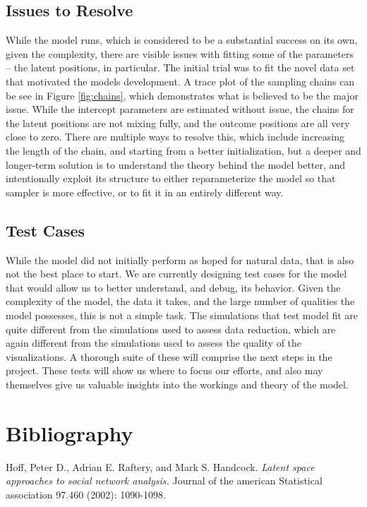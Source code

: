\documentclass[11pt]{scrartcl}
\begin{document}
\subsection{Issues to Resolve}
While the model runs, which is considered to be a substantial success on its own, given the complexity, there are visible issues with fitting some of the parameters -- the latent positions, in particular. The initial trial was to fit the novel data set that motivated the models development. A trace plot of the sampling chains can be see in Figure \ref{fig:chains}, which demonstrates what is believed to be the major issue. While the intercept parameters are estimated without issue, the chains for the latent positions are not mixing fully, and the outcome positions are all very close to zero. There are multiple ways to resolve this, which include increasing the length of the chain, and starting from a better initialization, but a deeper and longer-term solution is to understand the theory behind the model better, and intentionally exploit its structure to either reparameterize the model so that sampler is more effective, or to fit it in an entirely different way. 

\subsection{Test Cases}
While the model did not initially perform as hoped for natural data, that is also not the best place to start. We are currently designing test cases for the model that would allow us to better understand, and debug, its behavior. Given the complexity of the model, the data it takes, and the large number of qualities the model possesses, this is not a simple task. The simulations that test model fit are quite different from the simulations used to assess data reduction, which are again different from the simulations used to assess the quality of the visualizations. A thorough suite of these will comprise the next steps in the project. These tests will show us where to focus our efforts, and also may themselves give us valuable insights into the workings and theory of the model.





\section{Bibliography}

Hoff, Peter D., Adrian E. Raftery, and Mark S. Handcock. \textit{Latent space approaches to social network analysis.} Journal of the american Statistical association 97.460 (2002): 1090-1098.\\
\end{document}
